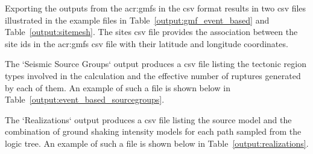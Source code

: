 Exporting the outputs from the \glspl{acr:gmf} in the csv format results in
two csv files illustrated in the example files in
Table~\ref{output:gmf_event_based} and Table~\ref{output:sitemesh}. The sites csv
file provides the association between the site ids in the \glspl{acr:gmf} csv
file with their latitude and longitude coordinates.




The `Seismic Source Groups` output produces a csv file listing the tectonic region
types involved in the calculation and the effective number of ruptures
generated by each of them. An example of such a file is shown below in
Table~\ref{output:event_based_sourcegroups}.




The `Realizations` output produces a csv file listing the source model and the
combination of ground shaking intensity models for each path sampled from the
logic tree. An example of such a file is shown below in
Table~\ref{output:realizations}.

